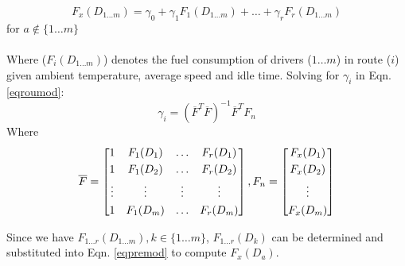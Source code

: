 \begin{equation}
F_x(D_{1 \ldots m}) = \gamma_0 + \gamma_1F_1(D_{1 \ldots m}) + \ldots +  \gamma_rF_r(D_{1 \ldots m})
\label{eqpremod}
\end{equation}
for \(a \notin \{1 \ldots m\}\)
\\\\
Where (\(F_i(D_{1 \ldots m})\)) denotes the fuel consumption of drivers (\(1 \ldots m\))  in route (\(i\)) given ambient temperature, average speed and idle time.
Solving for \(\gamma_i\)  in Eqn. \ref{eqroumod}:
\begin{equation}
\gamma_i = (\overline{F}^T \overline{F})^{-1}\overline{F}^T F_n
\label{eqgammod}
\end{equation}
Where
\begin{equation}
\notag
\overline{F} = \begin{bmatrix}
	1 & F_1(D_1) & \ldots & F_r(D_1) \\[0.3em]
	1 & F_1(D_2) & \ldots & F_r(D_2) \\[0.3em]
	\vdots & \vdots & \vdots & \vdots \\[0.3em]
	1 & F_1(D_m) & \ldots & F_r(D_m)
	\end{bmatrix}
,
F_n = \begin{bmatrix}
	F_x(D_1) \\[0.3em]
	F_x(D_2) \\[0.3em]
	\vdots \\[0.3em]
	F_x(D_m)
	\end{bmatrix}
\end{equation}

Since we have \(F_{1 \ldots r}(D_{1 \ldots m}), k \in \{1 \ldots m\}\), \(F_{1 \ldots r}(D_k)\)  can be determined and substituted into Eqn. \ref{eqpremod} to compute \(F_x(D_a)\).
